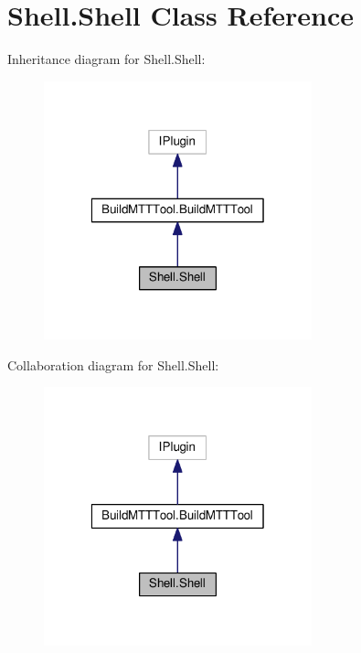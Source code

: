 \hypertarget{classShell_1_1Shell}{\section{Shell.\-Shell Class Reference}
\label{classShell_1_1Shell}
}


Inheritance diagram for Shell.\-Shell\-:
\nopagebreak
\begin{figure}[H]
\begin{center}
\leavevmode
\includegraphics[width=220pt]{classShell_1_1Shell__inherit__graph}
\end{center}
\end{figure}


Collaboration diagram for Shell.\-Shell\-:
\nopagebreak
\begin{figure}[H]
\begin{center}
\leavevmode
\includegraphics[width=220pt]{classShell_1_1Shell__coll__graph}
\end{center}
\end{figure}
